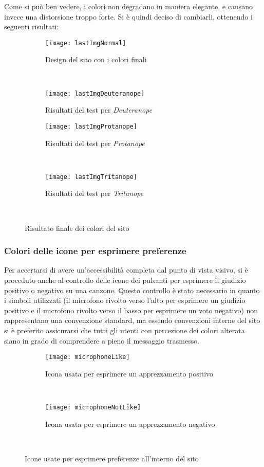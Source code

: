 Come si può ben vedere, i colori non degradano in maniera elegante, e causano invece una distorsione troppo forte. Si è quindi deciso di cambiarli, ottenendo i seguenti risultati:

\begin{figure}[H]
    \centering
    \begin{subfigure}[b]{0.45\textwidth}
        \texttt{[image: lastImgNormal]}
        \caption{Design del sito con i colori finali}
    \end{subfigure}
    ~
    \begin{subfigure}[b]{0.45\textwidth}
        \texttt{[image: lastImgDeuteranope]}
        \caption{Risultati del test per \textit{Deuteranope}}
    \end{subfigure}
    \newline
    \begin{subfigure}[b]{0.45\textwidth}
        \texttt{[image: lastImgProtanope]}
        \caption{Risultati del test per \textit{Protanope}}
    \end{subfigure}
    ~
    \begin{subfigure}[b]{0.45\textwidth}
        \texttt{[image: lastImgTritanope]}
        \caption{Risultati del test per \textit{Tritanope}}
    \end{subfigure}
    ~
    \caption{Risultato finale dei colori del sito}
\end{figure}


\subsubsection{Colori delle icone per esprimere preferenze}
Per accertarsi di avere un'accessibilit\`a completa dal punto di vista visivo, si \`e proceduto anche al controllo delle icone dei pulsanti per esprimere il giudizio positivo o negativo su una canzone. Questo controllo \`e stato necessario in quanto i simboli utilizzati (il microfono rivolto verso l'alto per esprimere un giudizio positivo e il microfono rivolto verso il basso per esprimere un voto negativo) non rappresentano una convenzione standard, ma essendo convenzioni interne del sito si \`e preferito assicurarsi che tutti gli utenti con percezione dei colori alterata siano in grado di comprendere a pieno il messaggio trasmesso.

\begin{figure}[H]
    \centering
    \begin{subfigure}[b]{0.4\textwidth}
        \texttt{[image: microphoneLike]}
        \caption{Icona usata per esprimere un apprezzamento positivo}
    \end{subfigure}
    ~
    \begin{subfigure}[b]{0.4\textwidth}
        \texttt{[image: microphoneNotLike]}
        \caption{Icona usata per esprimere un apprezzamento negativo}
    \end{subfigure}
    ~
    \caption{Icone usate per esprimere preferenze all'interno del sito}
\end{figure}

